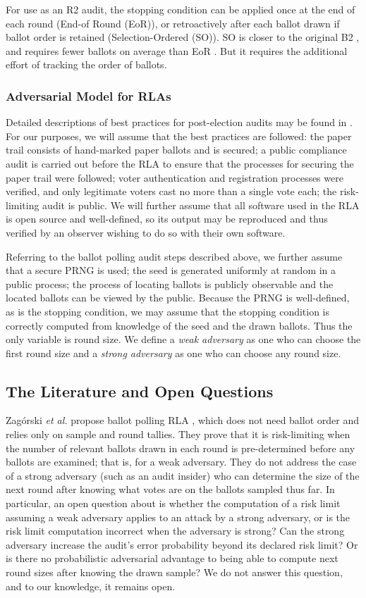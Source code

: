 For use as an R2 audit, the \BRAVO stopping condition can be applied once at the end of each round (End-of Round (EoR)), or retroactively after each ballot drawn if ballot order is retained (Selection-Ordered (SO)). SO \BRAVO is closer to the original B2 \BRAVO, and requires fewer ballots on average than EoR \BRAVO. But it requires the additional effort of tracking the order of ballots. 

\subsubsection{Adversarial Model for RLAs}
Detailed descriptions of best practices for post-election audits may be found in \cite{best-practices,why-and-how}. For our purposes, we will assume that the best practices are followed: the paper trail consists of hand-marked paper ballots and is secured; a public compliance audit is carried out before the RLA to ensure that the processes for securing the paper trail were followed; voter authentication and registration processes were verified, and only legitimate voters cast no more than a single vote each; the risk-limiting audit is public. We will further assume that all software used in the RLA is open source and well-defined, so its output may be reproduced and thus verified by an observer wishing to do so with their own software. 

Referring to the ballot polling audit steps described above, we further assume that a secure PRNG is used; the seed is generated uniformly at random in a public process; the process of locating ballots is publicly observable and the located ballots can be viewed by the public. Because the PRNG is well-defined, as is the stopping condition, we may assume that the stopping condition is correctly computed from knowledge of the seed and the drawn ballots. Thus the only variable is round size. We define a {\em weak adversary} as one who can choose the first round size and a {\em strong adversary} as one who can choose any round size. 

\subsection{The Literature and Open Questions}
Zag\'{o}rski {\em et al.} propose ballot polling RLA \Minerva \cite{usenix_minerva}, which does not need ballot order and relies only on sample and round tallies. They prove that it is risk-limiting when the number of relevant ballots drawn in each round is pre-determined before any ballots are examined; that is, for a weak adversary. They do not address the case of a strong adversary (such as an audit insider) who can determine the size of the next round after knowing what votes are on the ballots sampled thus far. In particular, an open question about \Minerva is whether the computation of a risk limit assuming a weak adversary applies to an attack by a strong adversary, or is the risk limit computation incorrect when the adversary is strong? Can the strong adversary increase the audit's error probability beyond its declared risk limit? Or is there no probabilistic adversarial advantage to being able to compute next round sizes after knowing the drawn sample? We do not answer this question, and to our knowledge, it remains open. 


